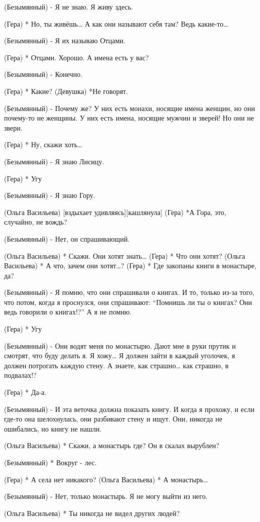 (Безымянный) - Я не знаю. Я живу здесь.

(Гера) * Но, ты живёшь… А как они называют себя там? Ведь какие-то…

(Безымянный) - Я их называю Отцами.

(Гера) * Отцами. Хорошо. А имена есть у вас?

(Безымянный) - Конечно.

(Гера) * Какие?
(Девушка) *Не говорят.

(Безымянный) - Почему же? У них есть монахи, носящие имена женщин, но они почему-то не женщины. У них есть имена, носящие мужчин и зверей! Но они не звери.

(Гера) * Ну, скажи хоть…

(Безымянный) - Я знаю Лисицу.

(Гера) * Угу

(Безымянный) - Я знаю Гору.

(Ольга Васильева) [вздыхает удивляясь][кашлянула]
(Гера) *А Гора, это, случайно, не вождь?

(Безымянный) - Нет, он спрашивающий.

(Ольга Васильева) * Скажи. Они хотят знать…
(Гера) * Что они хотят?
(Ольга Васильева) * А что, зачем они хотят…?
(Гера) * Где закопаны книги в монастыре, да?

(Безымянный) - Я помню, что они спрашивали о книгах. И то, только из-за того, что потом, когда я проснулся, они спрашивают: “Помнишь ли ты о книгах? Они ведь говорили о книгах!?” А я не помню.

(Гера) * Угу

(Безымянный) - Они водят меня по монастырю. Дают мне в руки прутик и смотрят, что буду делать я. Я хожу… Я должен зайти в каждый уголочек, я должен потрогать каждую стену. А знаете, как страшно… как страшно, в подвалах!?

(Гера) * Да-а.

(Безымянный) - И эта веточка должна показать книгу. И когда я прохожу, и если где-то она шелохнулась, они разбивают стену и ищут. Они, никогда не ошибались, но книгу не нашли. 

(Ольга Васильева) * Скажи, а монастырь где? Он в скалах вырублен?

(Безымянный) * Вокруг -  лес.

(Гера) * А села нет никакого?
(Ольга Васильева) * А монастырь…

(Безымянный) - Нет, только монастырь. Я не могу выйти из него.

(Ольга Васильева) * Ты никогда не видел других людей?

